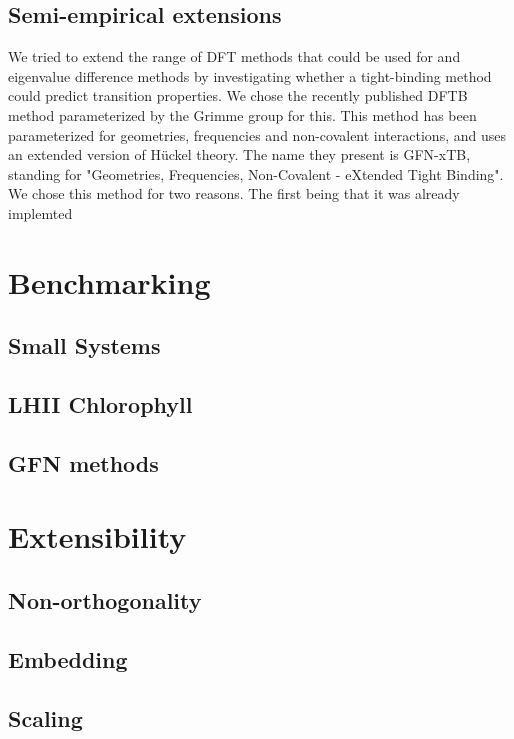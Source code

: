 \subsection{Semi-empirical extensions}
\label{subsec:dscf_xtb}
We tried to extend the range of DFT methods that could be used for \dscf and 
eigenvalue difference methods by investigating whether a tight-binding method
could predict transition properties.
We chose the recently published DFTB method parameterized by the Grimme group for
this. This method has been parameterized for geometries, frequencies and non-covalent
interactions, and uses an extended version of H{\"u}ckel theory. The name they
present is GFN-xTB, standing for "Geometries, Frequencies, Non-Covalent - eXtended 
Tight Binding".
We chose this method for two reasons. The first being that it was already 
implemted


\section{Benchmarking}
\label{sec:benchmarking}

\subsection{Small Systems}
\label{subsec:smalltest}

\subsection{LHII Chlorophyll}
\label{subsec:dscf_chl_tests}

\subsection{GFN methods}
\label{subsec:dscf_gfn_tests}


\section{Extensibility}
\label{sec:dscf_problems}

\subsection{Non-orthogonality}
\label{subsec:dscf_nonorth}

\subsection{Embedding}
\label{subsec:dscf_embedding}

\subsection{Scaling}
\label{subsec:dscf_scaling}